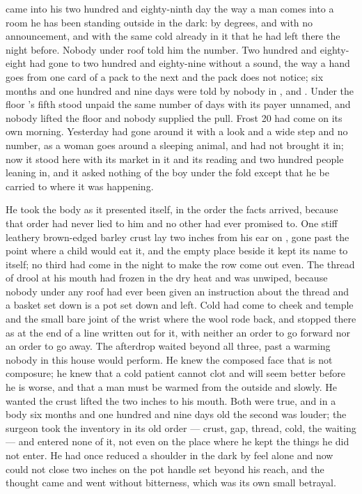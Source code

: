 
 came into his two hundred and eighty-ninth day the way a man comes into a room he has been standing outside in the dark: by degrees, and with no announcement, and with the same cold already in it that he had left there the night before. Nobody under  roof told him the number. Two hundred and eighty-eight had gone to two hundred and eighty-nine without a sound, the way a hand goes from one card of a pack to the next and the pack does not notice; six months and one hundred and nine days were told by nobody in ,  and . Under the floor 's fifth stood unpaid the same number of days with its payer unnamed, and nobody lifted the floor and nobody supplied the pull. Frost 20 had come on its own morning. Yesterday had gone around it with a look and a wide step and no number, as a woman goes around a sleeping animal, and had not brought it in; now it stood here with its market in it and its reading and two hundred people leaning in, and it asked nothing of the boy under the fold except that he be carried to where it was happening.

He took the body as it presented itself, in the order the facts arrived, because that order had never lied to him and no other had ever promised to. One stiff leathery brown-edged barley crust lay two inches from his ear on , gone past the point where a child would eat it, and the empty place beside it kept its name to itself; no third had come in the night to make the row come out even. The thread of drool at his mouth had frozen in the dry heat and was unwiped, because nobody under any roof had ever been given an instruction about the thread and a basket set down is a pot set down and left. Cold had come to cheek and temple and the small bare joint of the wrist where the wool rode back, and stopped there as at the end of a line written out for it, with neither an order to go forward nor an order to go away. The afterdrop waited beyond all three, past a warming nobody in this house would perform. He knew the composed face that is not composure; he knew that a cold patient cannot clot and will seem better before he is worse, and that a man must be warmed from the outside and slowly. He wanted the crust lifted the two inches to his mouth. Both were true, and in a body six months and one hundred and nine days old the second was louder; the surgeon took the inventory in its old order --- crust, gap, thread, cold, the waiting --- and entered none of it, not even on the place where he kept the things he did not enter. He had once reduced a shoulder in the dark by feel alone and now could not close two inches on the pot handle set beyond his reach, and the thought came and went without bitterness, which was its own small betrayal.

